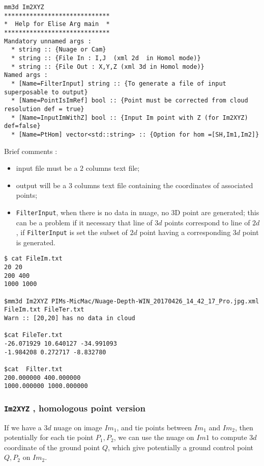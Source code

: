 \begin{verbatim}
mm3d Im2XYZ
*****************************
*  Help for Elise Arg main  *
*****************************
Mandatory unnamed args : 
  * string :: {Nuage or Cam}
  * string :: {File In : I,J  (xml 2d  in Homol mode)}
  * string :: {File Out : X,Y,Z (xml 3d in Homol mode)}
Named args : 
  * [Name=FilterInput] string :: {To generate a file of input superposable to output}
  * [Name=PointIsImRef] bool :: {Point must be corrected from cloud resolution def = true}
  * [Name=InputImWithZ] bool :: {Input Im point with Z (for Im2XYZ) def=false}
  * [Name=PtHom] vector<std::string> :: {Option for hom =[SH,Im1,Im2]}
\end{verbatim}

Brief comments :

\begin{itemize}
    \item input file must be a $2$ columns text file;

    \item output will be a $3$ columns text file containing the coordinates of associated points;

    \item {\tt FilterInput}, when there is no data in nuage, no 3D point  are generated; this can be a problem 
          if it necessary that line of $3d$ points correspond to line of $2d$, if {\tt FilterInput}
          is set the subset of $2d$ point having a corresponding $3d$ point is generated.
\end{itemize}


\begin{verbatim}
$ cat FileIm.txt
20 20
200 400
1000 1000

$mm3d Im2XYZ PIMs-MicMac/Nuage-Depth-WIN_20170426_14_42_17_Pro.jpg.xml FileIm.txt FileTer.txt
Warn :: [20,20] has no data in cloud

$cat FileTer.txt
-26.071929 10.640127 -34.991093
-1.984208 0.272717 -8.832780

$cat  Filter.txt 
200.000000 400.000000
1000.000000 1000.000000
\end{verbatim}


\subsubsection{{\tt Im2XYZ} , homologous point version}

\label{Im2XYZ:Hom}

If we have a $3d$ nuage on image $Im_1$, and tie points between
$Im_1$ and $Im_2$, then potentially for each tie point $P_1,P_2$,
we can use the nuage on $Im1$ to compute $3d$ coordinate of the ground point $Q$, which give
potentially a ground control point $Q,P_2$ on $Im_2$.  

